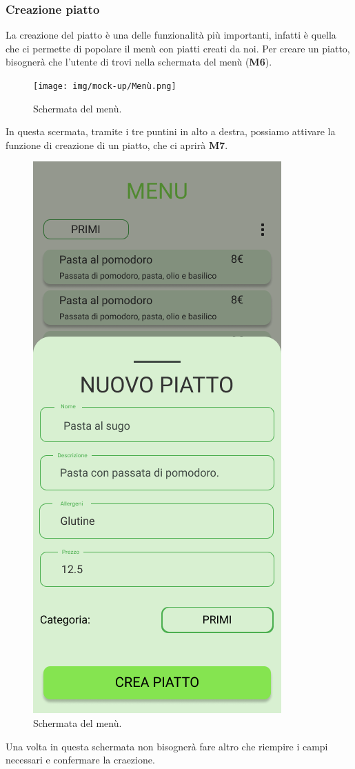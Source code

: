 \subsubsection{Creazione piatto}
La creazione del piatto è una delle funzionalità più importanti, infatti è quella che ci permette di popolare il menù con piatti creati da noi. Per creare un piatto, bisognerà che l'utente di trovi nella schermata del menù (\textbf{M6}).
\begin{figure}[H]
  \centering
  \texttt{[image: img/mock-up/Menù.png]}
  \caption{Schermata del menù.}
\end{figure}
\newpage
In questa scermata, tramite i tre puntini in alto a destra, possiamo attivare la funzione di creazione di un piatto, che ci aprirà \textbf{M7}.
\begin{figure}[H]
  \centering
  \includegraphics[scale=0.6]{img/mock-up/create_dish.png}
  \caption{Schermata del menù.}
\end{figure}
Una volta in questa schermata non bisognerà fare altro che riempire i campi necessari e confermare la craezione.
\newpage
